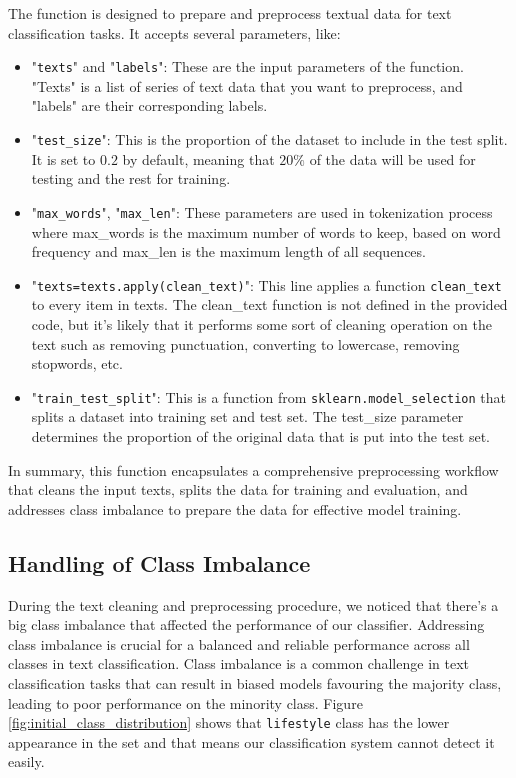 The  function is designed to prepare and preprocess textual data for text classification tasks. It accepts several parameters, like:
\begin{itemize}
	\item "\verb*|texts|" and "\verb*|labels|": These are the input parameters of the function. "Texts" is a list of series of text data that you want to preprocess, and "labels" are their corresponding labels.
	
	\item "\verb*|test_size|": This is the proportion of the dataset to include in the test split. It is set to $0.2$ by default, meaning that $20\%$ of the data will be used for testing and the rest for training.
	
	\item "\verb*|max_words|", "\verb*|max_len|":  These parameters are used in tokenization process where max\_words is the maximum number of words to keep, based on word frequency and max\_len is the maximum length of all sequences.
	
	\item "\verb*|texts=texts.apply(clean_text)|": This line applies a function \verb|clean_text| to every item in texts. The clean\_text function is not defined in the provided code, but it's likely that it performs some sort of cleaning operation on the text such as removing punctuation, converting to lowercase, removing stopwords, etc.
	
	\item "\verb*|train_test_split|": This is a function from \verb*|sklearn.model_selection| that splits a dataset into training set and test set. The test\_size parameter determines the proportion of the original data that is put into the test set.
\end{itemize} 

In summary, this function encapsulates a comprehensive preprocessing workflow that cleans the input texts, splits the data for training and evaluation, and addresses class imbalance to prepare the data for effective model training. 

\subsection{Handling of Class Imbalance}
During the text cleaning and preprocessing procedure, we noticed that there's a big class imbalance that affected the performance of our classifier. Addressing class imbalance is crucial for a balanced and reliable performance across all classes in text classification. Class imbalance is a common challenge in text classification tasks that can result in biased models favouring the majority class, leading to poor performance on the minority class. Figure \ref{fig:initial_class_distribution} shows that \verb|lifestyle| class has the lower appearance in the set and that means our classification system cannot detect it easily.

